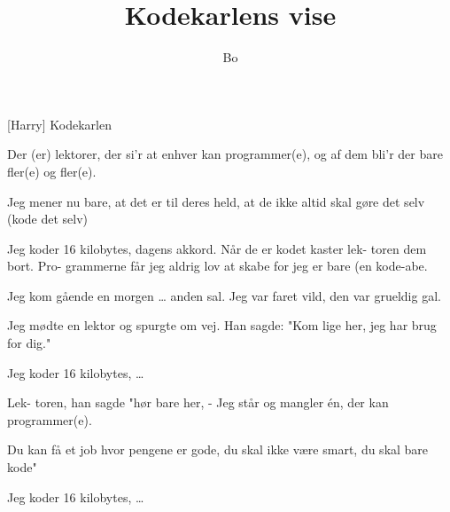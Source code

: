 \documentclass[a4paper,11pt]{article}
\title{Kodekarlens vise}
\author{Bo}
\begin{document}
\maketitle

\begin{roles}
[Harry] Kodekarlen 
\end{roles}

\begin{song}
     \quad Der (er)
              lektorer, der si'r at
              enhver kan programmer(e), og af
              dem bli'r der bare
              fler(e) og fler(e).

              \quad Jeg
              mener nu bare, at det er
              til deres held, at
              de ikke altid skal
              gøre det selv (kode det selv)

              \quad Jeg koder
              16 kilobytes,
              dagens akkord. Når de er
              kodet kaster lek-
              toren dem bort. Pro-
              grammerne får jeg aldrig
              lov at skabe
              for jeg er bare (en
              kode-abe.

              \quad Jeg kom
              gående en morgen \ldots
              anden sal. Jeg var
              faret vild, den var
              grueldig gal.

              \quad Jeg
              mødte en lektor og
              spurgte om vej. Han sagde:
              "Kom lige her, jeg har
              brug for dig."

              \quad Jeg koder
              16 kilobytes,
              \ldots

              \quad Lek-
              toren, han sagde
              "hør bare her,  - Jeg
              står og mangler én, der kan
              programmer(e).

              \quad Du kan
              få et job hvor
              pengene er gode, du skal
              ikke være smart, du skal
              bare kode"

              \quad\quad Jeg koder
              16 kilobytes,
              \ldots


\end{song}
\end{document}
